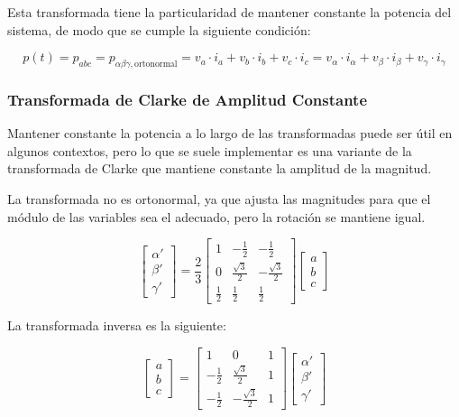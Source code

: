 Esta transformada tiene la particularidad de mantener constante la potencia del sistema, de modo que se cumple la siguiente condición:

\begin{equation}
p(t) = p_{abc} = p_{\alpha\beta\gamma, \text{ortonormal}} = v_a \cdot i_a + v_b \cdot i_b + v_c \cdot i_c = v_\alpha \cdot i_\alpha + v_\beta \cdot i_\beta + v_\gamma \cdot i_\gamma
\end{equation}

\subsubsection{Transformada de Clarke de Amplitud Constante}

Mantener constante la potencia a lo largo de las transformadas puede ser útil en algunos contextos, pero lo que se suele implementar es una variante de la transformada de Clarke que mantiene constante la amplitud de la magnitud.

La transformada no es ortonormal, ya que ajusta las magnitudes para que el módulo de las variables sea el adecuado, pero la rotación se mantiene igual.

\begin{equation}
    \begin{bmatrix}
        \alpha' \\
        \beta' \\
        \gamma'
    \end{bmatrix}
    =
    \frac{2}{3}
    \begin{bmatrix}
        1 & -\frac{1}{2} & -\frac{1}{2} \\
        0 & \frac{\sqrt{3}}{2} & -\frac{\sqrt{3}}{2} \\
        \frac{1}{2} & \frac{1}{2} & \frac{1}{2}
    \end{bmatrix}
    \begin{bmatrix}
        a \\
        b \\
        c
    \end{bmatrix}
\end{equation}

La transformada inversa es la siguiente:

\begin{equation}
    \begin{bmatrix}
        a \\
        b \\
        c
    \end{bmatrix}
    =
    \begin{bmatrix}
        1 & 0 & 1 \\
        -\frac{1}{2} & \frac{\sqrt{3}}{2} & 1 \\
        -\frac{1}{2} & -\frac{\sqrt{3}}{2} & 1
    \end{bmatrix}
    \begin{bmatrix}
        \alpha' \\
        \beta' \\
        \gamma'
    \end{bmatrix}
\end{equation}

